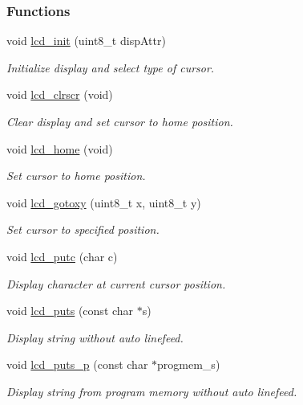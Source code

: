 \subsubsection*{Functions}
\begin{DoxyCompactItemize}
\item 
void \hyperlink{a00006_ga9af28b2779326b63ff4356e2b1828984}{lcd\+\_\+init} (uint8\+\_\+t disp\+Attr)
\begin{DoxyCompactList}\small\item\em Initialize display and select type of cursor. \end{DoxyCompactList}\item 
void \hyperlink{a00006_gaf8da853dba4b9d5f2aea4e294444e14d}{lcd\+\_\+clrscr} (void)
\begin{DoxyCompactList}\small\item\em Clear display and set cursor to home position. \end{DoxyCompactList}\item 
void \hyperlink{a00006_ga3aabf730aa4e0393bb5c959583c00a8e}{lcd\+\_\+home} (void)
\begin{DoxyCompactList}\small\item\em Set cursor to home position. \end{DoxyCompactList}\item 
void \hyperlink{a00006_gadbf47a5efdf02367ded1ebf8f9edb5fe}{lcd\+\_\+gotoxy} (uint8\+\_\+t x, uint8\+\_\+t y)
\begin{DoxyCompactList}\small\item\em Set cursor to specified position. \end{DoxyCompactList}\item 
void \hyperlink{a00006_gafa7e36b95c43d603f510273ad077cbbe}{lcd\+\_\+putc} (char c)
\begin{DoxyCompactList}\small\item\em Display character at current cursor position. \end{DoxyCompactList}\item 
void \hyperlink{a00006_ga8ffdfcac7638368ff04364c14984266e}{lcd\+\_\+puts} (const char $\ast$s)
\begin{DoxyCompactList}\small\item\em Display string without auto linefeed. \end{DoxyCompactList}\item 
void \hyperlink{a00006_ga9022a24a56a9b15681f62eb6ba77e5de}{lcd\+\_\+puts\+\_\+p} (const char $\ast$progmem\+\_\+s)
\begin{DoxyCompactList}\small\item\em Display string from program memory without auto linefeed. \end{DoxyCompactList}\item 

\end{DoxyCompactItemize}
